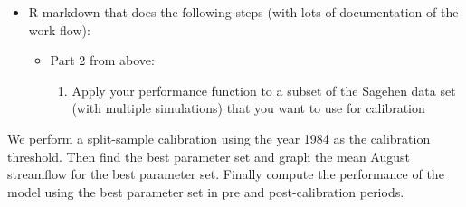 \documentclass[
  letterpaper,
  DIV=11,
  numbers=noendperiod]{scrartcl}
\providecommand{\tightlist}{%
  \setlength{\itemsep}{0pt}\setlength{\parskip}{0pt}}\usepackage{longtable,booktabs,array}
\begin{document}
\begin{itemize}
\item
  R markdown that does the following steps (with lots of documentation
  of the work flow):

  \begin{itemize}
  \item
    Part 2 from above:

    \begin{enumerate}
    \def\labelenumi{\arabic{enumi}.}
    \tightlist
    \item
      Apply your performance function to a subset of the Sagehen data
      set (with multiple simulations) that you want to use for
      calibration
    \end{enumerate}
  \end{itemize}
\end{itemize}

We perform a split-sample calibration using the year 1984 as the
calibration threshold. Then find the best parameter set and graph the
mean August streamflow for the best parameter set. Finally compute the
performance of the model using the best parameter set in pre and
post-calibration periods.
\end{document}
